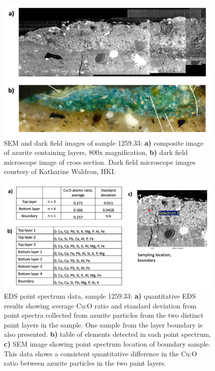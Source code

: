 \begin{figure}[H]
  \centering
  \includegraphics[width=\linewidth]{1259-33_imgs}
\caption[SEM and dark field images of sample 1259.33.]{SEM and dark field images of sample 1259.33: \textbf{a)} composite image of azurite containing layers, 800x magnification, \textbf{b)} dark field microscope image of cross section. Dark field microscope images courtesy of Katharine Waldron, HKI.}
\label{fig:1259.33_imgs}
\end{figure}

\begin{figure}[H]
  \centering
  \includegraphics[width=\linewidth]{1259-33_eds_pointspec}
\caption[EDS point spectrum data, sample 1259.33.]{EDS point spectrum data, sample 1259.33: \textbf{a)} quantitative EDS results showing average Cu:O ratio and standard deviation from point spectra collected from azurite particles from the two distinct paint layers in the sample. One sample from the layer boundary is also presented. \textbf{b)} table of elements detected in each point spectrum, \textbf{c)} SEM image showing point spectrum location of boundary sample. This data shows a consistent quantitative difference in the Cu:O ratio between azurite particles in the two paint layers.}
\label{fig:1259.33_pointspec}
\end{figure}

